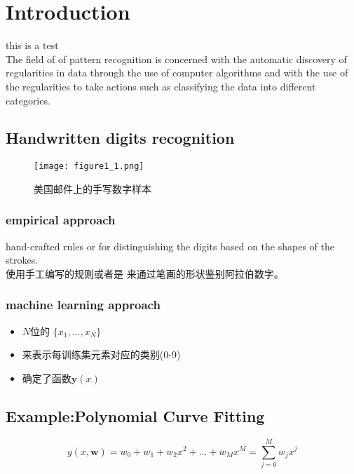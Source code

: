 \documentclass[cyan]{YuNote}
\begin{document}
\tableofcontents
\chapter{Introduction}
this is a test\\
The field of of pattern recognition is concerned with the automatic discovery of regularities in data through the use of computer algorithms and with the use of the regularities to take actions such as classifying the data into different categories.

\section{Handwritten digits recognition} 

\begin{figure}[!hbtp]
\center
\texttt{[image: figure1\_1.png]}
\caption{美国邮件上的手写数字样本}
\end{figure}

\subsection{empirical approach}
\begin{newpara}
hand-crafted rules or  for distinguishing the digits based on the shapes of the strokes.\\
使用手工编写的规则或者是 来通过笔画的形状鉴别阿拉伯数字。
\end{newpara}

\subsection{machine learning approach}
\begin{itemize}
\item$N$位的 $\lbrace x_1,\ldots,x_N\rbrace$
\item {}来表示每训练集元素对应的类别(0-9)
\item {}确定了函数$\textbf{y}(x)$
\end{itemize}


\section{Example:Polynomial Curve Fitting}
\begin{equation}
y(x,\textbf{w})=w_0+w_1+w_2x^2+\ldots+w_Mx^M=\sum_{j=0}^M w_jx^j
\end{equation}
\end{document}
